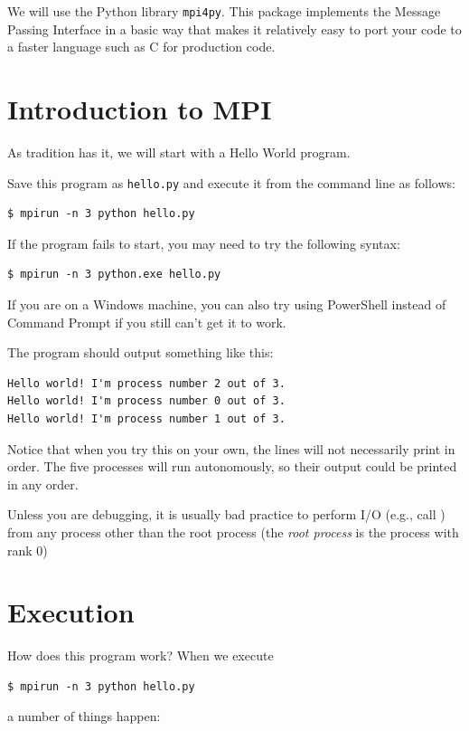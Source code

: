 We will use the Python library \texttt{mpi4py}. This package implements the
Message Passing Interface in a basic way that makes it relatively easy to port
your code to a faster language such as C for production code.

\section*{Introduction to MPI}
As tradition has it, we will start with a Hello World program.

Save this program as \texttt{hello.py} and execute it from the command line as follows:
\begin{lstlisting}[style=ShellInput]
$ mpirun -n 3 python hello.py
\end{lstlisting}
\begin{info}
If the program fails to start, you may need to try the following syntax:
\begin{lstlisting}[style=ShellInput]
$ mpirun -n 3 python.exe hello.py
\end{lstlisting}
If you are on a Windows machine, you can also try using PowerShell instead of
Command Prompt if you still can't get it to work.
\end{info}
The program should output something like this:
\begin{lstlisting}[style=ShellOutput]
Hello world! I'm process number 2 out of 3.
Hello world! I'm process number 0 out of 3.
Hello world! I'm process number 1 out of 3.
\end{lstlisting}

Notice that when you try this on your own, the lines will not necessarily print
in order. The five processes will run autonomously, so their output could be
printed in any order.

\begin{warn}
Unless you are debugging, it is usually bad practice to perform I/O (e.g., call
) from any process other than the root process (the \emph{root
process} is the process with rank 0)
\end{warn}

\section*{Execution}
How does this program work? When we execute
\begin{lstlisting}[style=ShellInput]
$ mpirun -n 3 python hello.py
\end{lstlisting}
a number of things happen:

